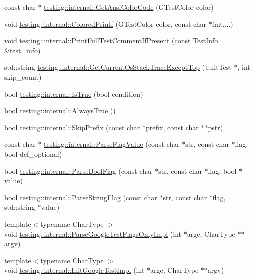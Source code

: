 \begin{DoxyCompactItemize}
\item 
const char $\ast$ \hyperlink{namespacetesting_1_1internal_ae132b16818cf4a060eb8d3940fe858f3}{testing\-::internal\-::\-Get\-Ansi\-Color\-Code} (G\-Test\-Color color)
\item 
void \hyperlink{namespacetesting_1_1internal_adef3055706176001364e54eb73a87e31}{testing\-::internal\-::\-Colored\-Printf} (G\-Test\-Color color, const char $\ast$fmt,...)
\item 
void \hyperlink{namespacetesting_1_1internal_a7a85ebe3b4de93a1edb091f92f1fb393}{testing\-::internal\-::\-Print\-Full\-Test\-Comment\-If\-Present} (const Test\-Info \&test\-\_\-info)
\item 
std\-::string \hyperlink{namespacetesting_1_1internal_a7ca65eb9f24d89fbc1e8cb108d3c6339}{testing\-::internal\-::\-Get\-Current\-Os\-Stack\-Trace\-Except\-Top} (Unit\-Test $\ast$, int skip\-\_\-count)
\item 
bool \hyperlink{namespacetesting_1_1internal_a527b9bcc13669b9a16400c8514266254}{testing\-::internal\-::\-Is\-True} (bool condition)
\item 
bool \hyperlink{namespacetesting_1_1internal_a922c9da63cd4bf94fc473b9ecac76414}{testing\-::internal\-::\-Always\-True} ()
\item 
bool \hyperlink{namespacetesting_1_1internal_a244d9a3765727306b597b8992ab84036}{testing\-::internal\-::\-Skip\-Prefix} (const char $\ast$prefix, const char $\ast$$\ast$pstr)
\item 
const char $\ast$ \hyperlink{namespacetesting_1_1internal_a72518f8c6521a4af1b41215e0fca011c}{testing\-::internal\-::\-Parse\-Flag\-Value} (const char $\ast$str, const char $\ast$flag, bool def\-\_\-optional)
\item 
bool \hyperlink{namespacetesting_1_1internal_ada3b98e7cfe93f4ba2053c470d9e3e51}{testing\-::internal\-::\-Parse\-Bool\-Flag} (const char $\ast$str, const char $\ast$flag, bool $\ast$value)
\item 
bool \hyperlink{namespacetesting_1_1internal_aa4ce312efaaf7a97aac2303173afe021}{testing\-::internal\-::\-Parse\-String\-Flag} (const char $\ast$str, const char $\ast$flag, std\-::string $\ast$value)
\item 
{\footnotesize template$<$typename Char\-Type $>$ }\\void \hyperlink{namespacetesting_1_1internal_ae4c46ce8c3d016848fff52cc5133f2ac}{testing\-::internal\-::\-Parse\-Google\-Test\-Flags\-Only\-Impl} (int $\ast$argc, Char\-Type $\ast$$\ast$argv)
\item 
{\footnotesize template$<$typename Char\-Type $>$ }\\void \hyperlink{namespacetesting_1_1internal_ac3c6fa93391768aa91c6238b31aaeeb5}{testing\-::internal\-::\-Init\-Google\-Test\-Impl} (int $\ast$argc, Char\-Type $\ast$$\ast$argv)
$$
\end{DoxyCompactItemize}

